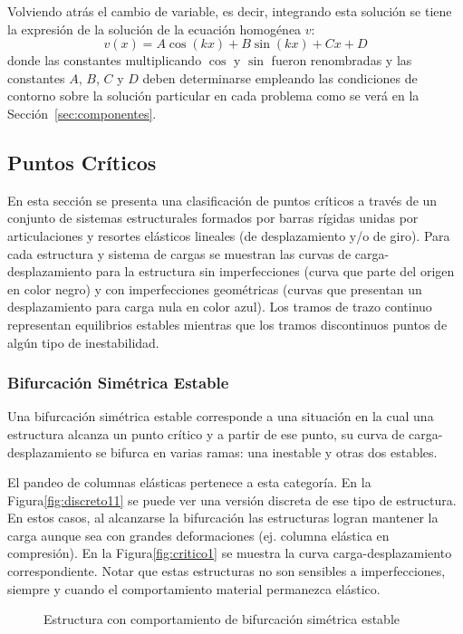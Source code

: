 Volviendo atrás el cambio de variable, es decir, integrando esta solución se tiene la expresión de la solución de la ecuación homogénea $v$:
%
\begin{equation}
v(x) = A \cos (kx) + B \sin (kx) + Cx + D
\end{equation}
%
donde las constantes multiplicando $\cos$ y $\sin$ fueron renombradas y las constantes $A$, $B$, $C$ y $D$ deben determinarse empleando las condiciones de contorno sobre la solución particular en cada problema como se verá en la Sección~\ref{sec:componentes}.


\subsection{Puntos Críticos}

En esta sección se presenta una clasificación de puntos críticos a través de un conjunto de sistemas estructurales formados por barras rígidas unidas por articulaciones y resortes elásticos lineales (de desplazamiento y/o de giro). Para cada estructura y sistema de cargas se muestran las curvas de carga-desplazamiento para la estructura sin imperfecciones (curva que parte del origen en color negro) y con imperfecciones geométricas (curvas que presentan un desplazamiento para carga nula en color azul). Los tramos de trazo continuo representan equilibrios estables mientras que los tramos discontinuos puntos de algún tipo de inestabilidad.

\subsubsection{Bifurcación Simétrica Estable}

Una bifurcación simétrica estable corresponde a una situación en la cual una estructura alcanza un punto crítico y a partir de ese punto, su curva de carga-desplazamiento se bifurca en varias ramas: una inestable y otras dos estables.

El pandeo de columnas elásticas pertenece a esta categoría. En la Figura\autoref{fig:discreto11} se puede ver una versión discreta de ese tipo de estructura. En estos casos, al alcanzarse la bifurcación las estructuras logran mantener la carga aunque sea con grandes deformaciones (ej. columna elástica en compresión). En la Figura\autoref{fig:critico1} se muestra la curva carga-desplazamiento correspondiente. Notar que estas estructuras no son sensibles a imperfecciones, siempre y cuando el comportamiento material permanezca elástico.
\begin{figure}[htb]
	\centering
{}
\hspace{1em}
\caption{Estructura con comportamiento de bifurcación simétrica estable}
	\label{fig:simetrica1}
\end{figure}

